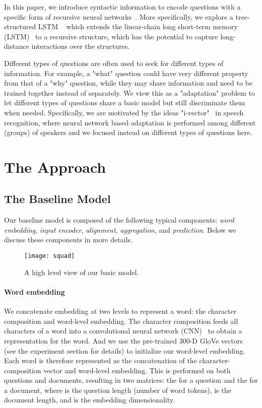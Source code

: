 \documentclass{article}
\begin{document}
In this paper, we introduce syntactic information to encode questions with a specific form of recursive neural networks~\citep{zhu2015long,Tai2015,chen2016enhancing,Socher2011Parsing}. More specifically, we explore a tree-structured LSTM ~\citep{zhu2015long,Tai2015} which extends the linear-chain long short-term memory (LSTM)~\citep{hochreiter1997long} to a recursive structure, which has the potential to capture long-distance interactions over the structures. 


Different types of questions are often used to seek for different types of information. For example, a "what" question could have very different property from that of a "why" question, while they may share information and need to be trained together instead of separately. We view this as a "adaptation" problem to let different types of questions share a basic model but still discriminate them when needed. Specifically, we are motivated by the ideas "i-vector"~\citep{dehak2011front} in speech recognition, where neural network based adaptation is performed among different (groups) of speakers and we focused instead on different types of questions here.


\section{The Approach}
\subsection{The Baseline Model}
Our baseline model is composed of the following typical components: \textit{word embedding}, \textit{input encoder}, \textit{alignment}, \textit{aggregation}, and \textit{prediction}. Below we discuss these components in more details.


\begin{figure}[h]
	\centering
	\texttt{[image: squad]}
	\caption{A high level view of our basic model.}
	\label{fig:squad}
\end{figure}

\paragraph{Word embedding}
We concatenate embedding at two levels to represent a word: the character composition and word-level embedding. The character composition feeds all characters of a word into a convolutional neural network (CNN)~\citep{kim2014convolutional} to obtain a representation for the word. And we use the pre-trained 300-D GloVe vectors~\citep{pennington2014glove} (see the experiment section for details) to initialize our word-level embedding. Each word is therefore represented as the concatenation of the character-composition vector and word-level embedding. This is performed on both questions and documents, resulting in two matrices: the  for a question and the  for a document, where  is the question length (number of word tokens),  is the document length, and  is the embedding dimensionality.
\end{document}
